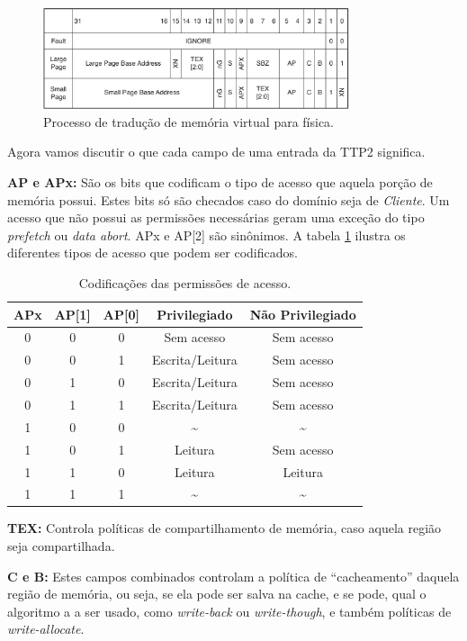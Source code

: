 \begin{figure}[h]
    \centering
    \includegraphics[width=9cm]{figuras/l2_entry}
    \caption{Processo de tradução de memória virtual para física.}
    \label{fig:l2_entry}
\end{figure}

Agora vamos discutir o que cada campo de uma entrada da TTP2 significa.

\textbf{AP e APx:} São os bits que codificam o tipo de acesso que aquela porção de memória possui. Estes bits só são checados caso do domínio seja de \emph{Cliente}. Um acesso que não possui as permissões necessárias geram uma exceção do tipo \emph{prefetch} ou \emph{data abort}. APx e AP[2] são sinônimos. A tabela \ref{tab:apx} ilustra os diferentes tipos de acesso que podem ser codificados.

\begin{table}[h]
	\centering
	\begin{tabular}{ccccc}
		\hline \hline
		APx & AP[1] & AP[0] & Privilegiado & Não Privilegiado\\[0.5ex]
		\hline
		0 & 0 & 0 & Sem acesso & Sem acesso\\
		0 & 0 & 1 & Escrita/Leitura & Sem acesso\\
		0 & 1 & 0 & Escrita/Leitura & Sem acesso\\
		0 & 1 & 1 & Escrita/Leitura & Sem acesso\\
		1 & 0 & 0 & \~{} 			& \~{}		 \\
		1 & 0 & 1 & Leitura 		& Sem acesso \\
		1 & 1 & 0 & Leitura 		& Leitura	 \\
		1 & 1 & 1 & \~{} 			& \~{}		 \\[1ex]
		\hline
	\end{tabular}
	\caption{Codificações das permissões de acesso.}
	\label{tab:apx}
\end{table}


\textbf{TEX:} Controla políticas de compartilhamento de memória, caso aquela região seja compartilhada.

\textbf{C e B:} Estes campos combinados controlam a política de ``cacheamento'' daquela região de memória, ou seja, se ela pode ser salva na cache, e se pode, qual o algoritmo a a ser usado, como \emph{write-back} ou \emph{write-though}, e também políticas de \emph{write-allocate}.

